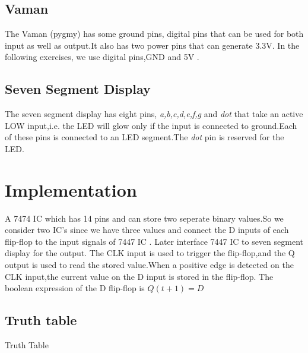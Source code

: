 \documentclass[10pt,a4paper]{article}
\begin{document}
\subsection{Vaman} 
The Vaman (pygmy) has some ground pins, digital pins that can be used for both input as well as output.It also has two power pins that can generate 3.3V. In the following exercises, we use digital pins,GND and 5V .
\subsection{Seven Segment Display}
The seven segment display has eight pins, \emph{a,b,c,d,e,f,g} and \emph{dot} that take an active LOW input,i.e. the LED will glow only if the input is connected to ground.Each of these pins is connected to an LED segment.The \emph{dot} pin is reserved for the LED.
\section{Implementation}
A 7474 IC which  has 14 pins and can store two seperate binary values.So we consider two IC's since we have three values  and connect the  D inputs of each flip-flop to the input signals of 7447 IC . Later interface 7447 IC to seven segment display for the output. The CLK input is used to trigger the flip-flop,and the Q output is used to read the stored value.When a positive edge is detected on the CLK input,the current value on the D input is stored in the flip-flop. The boolean expression of the D flip-flop is $Q(t+1) = D$
\subsection{Truth table}
\begin{table}[!h]
\centering
   
\caption{Truth Table}
\label{table:truth_table}
\end{table}
\end{document}
